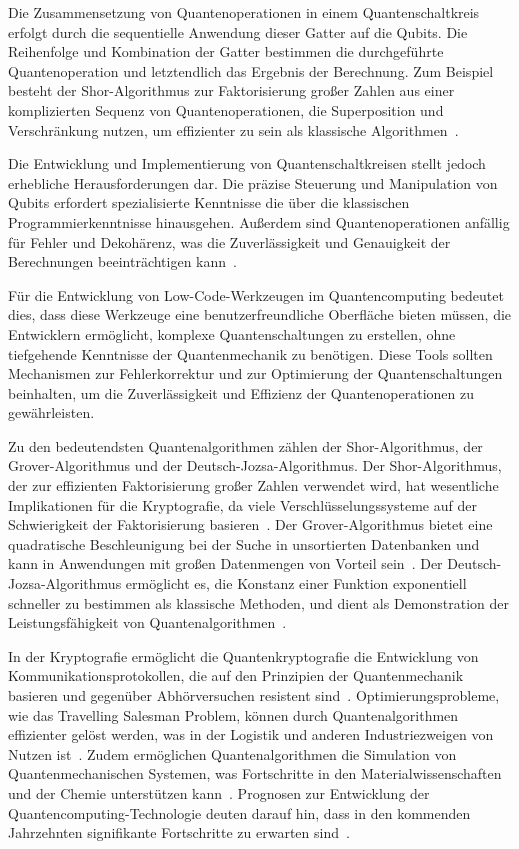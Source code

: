 Die Zusammensetzung von Quantenoperationen in einem Quantenschaltkreis erfolgt durch die sequentielle Anwendung 
dieser Gatter auf die Qubits. Die Reihenfolge und Kombination der Gatter bestimmen die durchgeführte 
Quantenoperation und letztendlich das Ergebnis der Berechnung. 
Zum Beispiel besteht der Shor-Algorithmus zur Faktorisierung großer Zahlen aus einer komplizierten Sequenz von 
Quantenoperationen, die Superposition und Verschränkung nutzen, um effizienter zu sein als klassische Algorithmen~\cite{shor1999polynomial}.

Die Entwicklung und Implementierung von Quantenschaltkreisen stellt jedoch erhebliche Herausforderungen 
dar. Die präzise Steuerung und Manipulation von Qubits erfordert spezialisierte Kenntnisse 
die über die klassischen Programmierkenntnisse hinausgehen. Außerdem sind 
Quantenoperationen anfällig für Fehler und Dekohärenz, was die Zuverlässigkeit und Genauigkeit der 
Berechnungen beeinträchtigen kann~\cite{preskill2018quantum}.

Für die Entwicklung von Low-Code-Werkzeugen im Quantencomputing bedeutet dies, dass diese Werkzeuge eine 
benutzerfreundliche Oberfläche bieten müssen, die Entwicklern ermöglicht, komplexe Quantenschaltungen 
zu erstellen, ohne tiefgehende Kenntnisse der Quantenmechanik zu benötigen. Diese Tools sollten Mechanismen 
zur Fehlerkorrektur und zur Optimierung der Quantenschaltungen beinhalten, um die Zuverlässigkeit und 
Effizienz der Quantenoperationen zu gewährleisten. 

Zu den bedeutendsten Quantenalgorithmen zählen der Shor-Algorithmus, der Grover-Algorithmus und der 
Deutsch-Jozsa-Algorithmus. Der Shor-Algorithmus, der zur effizienten Faktorisierung großer Zahlen 
verwendet wird, hat wesentliche Implikationen für die Kryptografie, da viele Verschlüsselungssysteme 
auf der Schwierigkeit der Faktorisierung basieren~\cite{shor1999polynomial}. Der Grover-Algorithmus bietet eine 
quadratische Beschleunigung bei der Suche in unsortierten Datenbanken und kann in Anwendungen mit 
großen Datenmengen von Vorteil sein~\cite{grover1996fast}. Der Deutsch-Jozsa-Algorithmus ermöglicht es, die 
Konstanz einer Funktion exponentiell schneller zu bestimmen als klassische Methoden, und dient als 
Demonstration der Leistungsfähigkeit von Quantenalgorithmen~\cite{deutsch1992rapid}.

In der Kryptografie ermöglicht die Quantenkryptografie die Entwicklung von Kommunikationsprotokollen, die auf den Prinzipien der 
Quantenmechanik basieren und gegenüber Abhörversuchen resistent sind~\cite{bennett2014quantum}. 
Optimierungsprobleme, wie das Travelling Salesman Problem, können durch Quantenalgorithmen effizienter 
gelöst werden, was in der Logistik und anderen Industriezweigen von Nutzen ist~\cite{farhi2000quantum}. 
Zudem ermöglichen Quantenalgorithmen die Simulation von Quantenmechanischen Systemen, was Fortschritte 
in den Materialwissenschaften und der Chemie unterstützen kann~\cite{aspuru2005simulated}. Prognosen zur Entwicklung der Quantencomputing-Technologie 
deuten darauf hin, dass in den kommenden Jahrzehnten signifikante Fortschritte zu erwarten sind~\cite{ladd2010quantum}.

